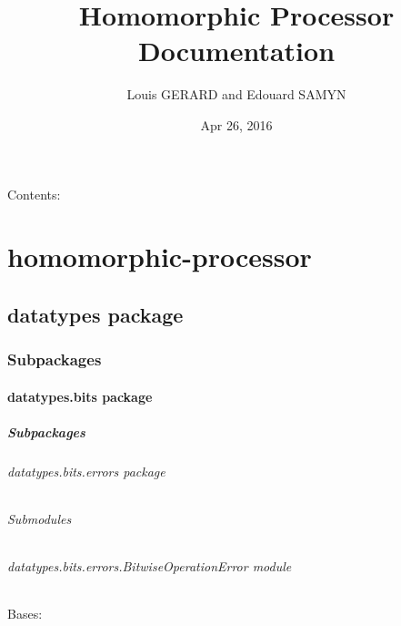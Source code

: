 \documentclass[letterpaper,10pt,english]{sphinxmanual}
\title{Homomorphic Processor Documentation}
\date{Apr 26, 2016}
\author{Louis GERARD and Edouard SAMYN}
\begin{document}
\maketitle
\tableofcontents
{}\label{index::doc}


Contents:


\chapter{homomorphic-processor}
\label{index:homomorphic-processor}\label{index:welcome-to-homomorphic-processor-s-documentation}\label{index:foo-bar}

\section{datatypes package}
\label{datatypes::doc}\label{datatypes:datatypes-package}

\subsection{Subpackages}
\label{datatypes:subpackages}

\subsubsection{datatypes.bits package}
\label{datatypes.bits::doc}\label{datatypes.bits:datatypes-bits-package}

\paragraph{Subpackages}
\label{datatypes.bits:subpackages}

\subparagraph{datatypes.bits.errors package}
\label{datatypes.bits.errors:datatypes-bits-errors-package}\label{datatypes.bits.errors::doc}

\subparagraph{Submodules}
\label{datatypes.bits.errors:submodules}

\subparagraph{datatypes.bits.errors.BitwiseOperationError module}
\label{datatypes.bits.errors:module-datatypes.bits.errors.BitwiseOperationError}\label{datatypes.bits.errors:datatypes-bits-errors-bitwiseoperationerror-module}

\begin{fulllineitems}
\label{datatypes.bits.errors:datatypes.bits.errors.BitwiseOperationError.BitwiseOperationError}
Bases: 

\end{fulllineitems}
\end{document}
